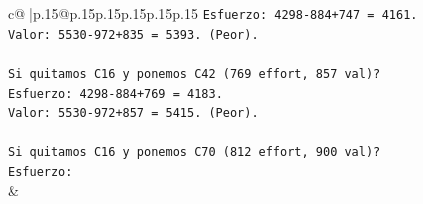 \documentclass{article}
\begin{document}
{\begin{supertabular}{c@{$\;$}|p{.15\linewidth}@{}p{.15\linewidth}p{.15\linewidth}p{.15\linewidth}p{.15\linewidth}p{.15\linewidth}}
{{{\texttt{Esfuerzo: 4298{-}884+747 = 4161.} \\
\texttt{Valor: 5530{-}972+835 = 5393. (Peor).} \\
\\ 
\texttt{Si quitamos C16 y ponemos C42 (769 effort, 857 val)?} \\
\texttt{Esfuerzo: 4298{-}884+769 = 4183.} \\
\texttt{Valor: 5530{-}972+857 = 5415. (Peor).} \\
\\ 
\texttt{Si quitamos C16 y ponemos C70 (812 effort, 900 val)?} \\
\texttt{Esfuerzo:} \\
            }
        }
    }
    & \\ \\


\end{supertabular}}
\end{document}
